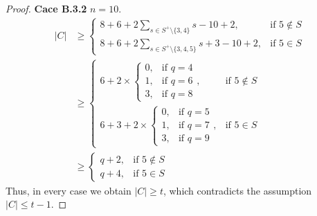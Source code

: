 \documentclass[10pt,a4paper]{amsart}
\begin{document}
\begin{proof}
{\bf Cace B.3.2}  $n=10$.
\begin{align*}
|C| &\geq 
\begin{cases}
\displaystyle 8 + 6+2\sum_{s\in S^+\setminus\{3,4\}} s-10+2, & \text{if } 5\notin S \\[4pt]
\displaystyle 8 +6+ 2\sum_{s\in S^+\setminus\{3,4,5\}} s+ 3-10+2, & \text{if } 5\in S
\end{cases} \\
&\geq 
\begin{cases}
\displaystyle 6 + 2\times
\begin{cases}
0, & \text{if } q=4 \\
1, & \text{if } q=6 \\
3, & \text{if } q=8 
\end{cases}, & \text{if } 5\notin S \\[4pt]
\displaystyle 6+ 3 + 2\times
\begin{cases}
0, & \text{if } q=5 \\
1, & \text{if } q=7 \\
3, & \text{if } q=9 
\end{cases}, & \text{if } 5\in S
\end{cases} \\
&\geq 
\begin{cases}
\displaystyle q+2, & \text{if } 5\notin S \\[4pt]
\displaystyle q+4, & \text{if } 5\in S
\end{cases}
\end{align*}
Thus, in every case we obtain \(|C| \ge t\), which contradicts the assumption \(|C| \le t-1\).
\end{proof}
\end{document}
